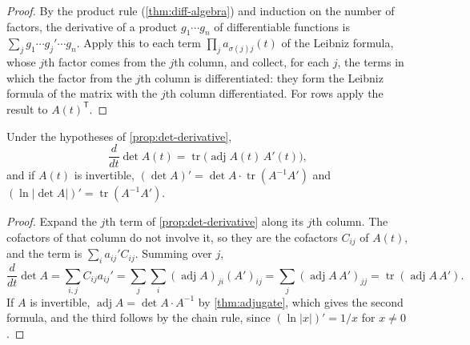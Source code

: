 \begin{proof}
By the product rule (\cref{thm:diff-algebra}) and induction on the number of factors, the derivative of a product $g_1\cdots g_n$ of differentiable functions is $\sum_jg_1\cdots g_j'\cdots g_n$. Apply this to each term $\prod_ja_{\sigma(j)j}(t)$ of the Leibniz formula, whose $j$th factor comes from the $j$th column, and collect, for each $j$, the terms in which the factor from the $j$th column is differentiated: they form the Leibniz formula of the matrix with the $j$th column differentiated. For rows apply the result to $A(t)^{\mathsf T}$.
\end{proof}

\begin{theorem}
\label{thm:jacobi-formula}
Under the hypotheses of \cref{prop:det-derivative},
\[
\frac{d}{dt}\det A(t)=\operatorname{tr}\bigl(\operatorname{adj}A(t)\,A'(t)\bigr),
\]
and if $A(t)$ is invertible, $(\det A)'=\det A\cdot\operatorname{tr}(A^{-1}A')$ and $(\ln|\det A|)'=\operatorname{tr}(A^{-1}A')$.
\end{theorem}

\begin{proof}
Expand the $j$th term of \cref{prop:det-derivative} along its $j$th column. The cofactors of that column do not involve it, so they are the cofactors $C_{ij}$ of $A(t)$, and the term is $\sum_ia_{ij}'C_{ij}$. Summing over $j$,
\[
\frac{d}{dt}\det A=\sum_{i,j}C_{ij}a_{ij}'=\sum_j\sum_i(\operatorname{adj}A)_{ji}(A')_{ij}=\sum_j(\operatorname{adj}A\,A')_{jj}=\operatorname{tr}(\operatorname{adj}A\,A').
\]
If $A$ is invertible, $\operatorname{adj}A=\det A\cdot A^{-1}$ by \cref{thm:adjugate}, which gives the second formula, and the third follows by the chain rule, since $(\ln|x|)'=1/x$ for $x\ne0$.
\end{proof}

